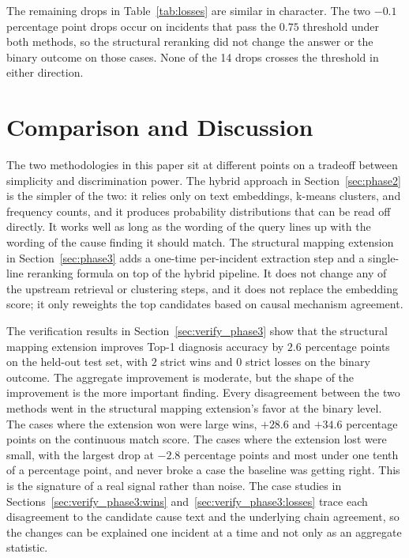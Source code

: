 \documentclass[11pt]{article}
\begin{document}
The remaining drops in Table~\ref{tab:losses} are similar in character. The two $-0.1$ percentage point drops occur on incidents that pass the $0.75$ threshold under both methods, so the structural reranking did not change the answer or the binary outcome on those cases. None of the 14 drops crosses the threshold in either direction.

\section{Comparison and Discussion}
\label{sec:discussion}

The two methodologies in this paper sit at different points on a tradeoff between simplicity and discrimination power. The hybrid approach in Section~\ref{sec:phase2} is the simpler of the two: it relies only on text embeddings, k-means clusters, and frequency counts, and it produces probability distributions that can be read off directly. It works well as long as the wording of the query lines up with the wording of the cause finding it should match. The structural mapping extension in Section~\ref{sec:phase3} adds a one-time per-incident extraction step and a single-line reranking formula on top of the hybrid pipeline. It does not change any of the upstream retrieval or clustering steps, and it does not replace the embedding score; it only reweights the top candidates based on causal mechanism agreement.

The verification results in Section~\ref{sec:verify_phase3} show that the structural mapping extension improves Top-1 diagnosis accuracy by $2.6$ percentage points on the held-out test set, with $2$ strict wins and $0$ strict losses on the binary outcome. The aggregate improvement is moderate, but the shape of the improvement is the more important finding. Every disagreement between the two methods went in the structural mapping extension's favor at the binary level. The cases where the extension won were large wins, $+28.6$ and $+34.6$ percentage points on the continuous match score. The cases where the extension lost were small, with the largest drop at $-2.8$ percentage points and most under one tenth of a percentage point, and never broke a case the baseline was getting right. This is the signature of a real signal rather than noise. The case studies in Sections~\ref{sec:verify_phase3:wins} and~\ref{sec:verify_phase3:losses} trace each disagreement to the candidate cause text and the underlying chain agreement, so the changes can be explained one incident at a time and not only as an aggregate statistic.
\end{document}

